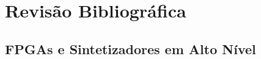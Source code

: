 \section{Revisão Bibliográfica} \label{chap:revisao_bibliografica}

\subsection{FPGAs e Sintetizadores em Alto Nível}



